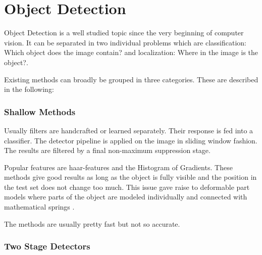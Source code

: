 	\section{Object Detection}
	Object Detection is a well studied topic since the very beginning of computer vision. It can be separated in two individual problems which are classification: Which object does the image contain? and localization: Where in the image is the object?.
	
	Existing methods can broadly be grouped in three categories. These are described in the following:

	\subsubsection{Shallow Methods}
	
	Usually filters are handcrafted or learned separately. Their response is fed into a classifier. The detector pipeline is applied on the image in sliding window fashion. The results are filtered by a final non-maximum suppression stage. 
	
	Popular features are haar-features \cite{Viola2004} and the Histogram of Gradients\cite{Forsyth}. These methods give good results as long as the object is fully visible and the position in the test set does not change too much. This issue gave raise to deformable part models where parts of the object are modeled individually and connected with mathematical springs \cite{Viola2004}.
	
	The methods are usually pretty fast but not so accurate.
	
	\subsubsection{Two Stage Detectors}
	
